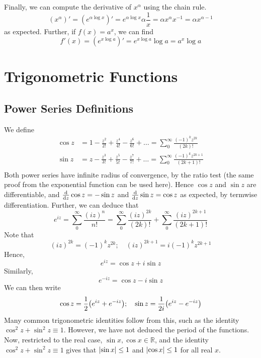\documentclass{article}
\begin{document}
Finally, we can compute the derivative of $x^\alpha$ using the chain rule.
\[ (x^\alpha)' = \left( e^{\alpha \log x} \right)' = e^{\alpha \log x} \alpha \frac{1}{x} = \alpha x^\alpha x^{-1} = \alpha x^{\alpha - 1} \]
as expected. Further, if $f(x) = a^x$, we can find
\[ f'(x) = \left( e^{x \log a} \right)' = e^{x \log a} \log a = a^x \log a \]

\section{Trigonometric Functions}
\subsection{Power Series Definitions}
We define
\begin{align*}
    \cos z & = 1 - \frac{z^2}{2!} + \frac{z^4}{4!} - \frac{z^6}{6!} + \dots = \sum_0^\infty \frac{(-1)^k z^{2k}}{(2k)!}     \\
    \sin z & = z - \frac{z^3}{3!} + \frac{z^5}{5!} - \frac{z^7}{7!} + \dots = \sum_0^\infty \frac{(-1)^k z^{2k+1}}{(2k+1)!} \\
\end{align*}
Both power series have infinite radius of convergence, by the ratio test (the same proof from the exponential function can be used here). Hence $\cos z$ and $\sin z$ are differentiable, and $\dv{z}\cos z = -\sin z$ and $\dv{z}\sin z = \cos z$ as expected, by termwise differentiation. Further, we can deduce that
\[ e^{iz} = \sum_0^\infty \frac{(iz)^n}{n!} = \sum_0^\infty \frac{(iz)^{2k}}{(2k)!} + \sum_0^\infty \frac{(iz)^{2k+1}}{(2k+1)!} \]
Note that
\[ (iz)^{2k} = (-1)^k z^{2k};\quad (iz)^{2k+1} = i (-1)^k z^{2k+1} \]
Hence,
\[ e^{iz} = \cos z + i \sin z \]
Similarly,
\[ e^{-iz} = \cos z - i \sin z \]
We can then write
\[ \cos z = \frac{1}{2}\qty( e^{iz} + e^{-iz} );\quad \sin z = \frac{1}{2i}\qty( e^{iz} - e^{-iz} ) \]
Many common trigonometric identities follow from this, such as the identity $\cos^2 z + \sin^2 z \equiv 1$. However, we have not deduced the period of the functions. Now, restricted to the real case, $\sin x, \cos x \in \mathbb R$, and the identity $\cos^2 z + \sin^2 z \equiv 1$ gives that $\abs{\sin x} \leq 1$ and $\abs{\cos x} \leq 1$ for all real $x$.
\end{document}
